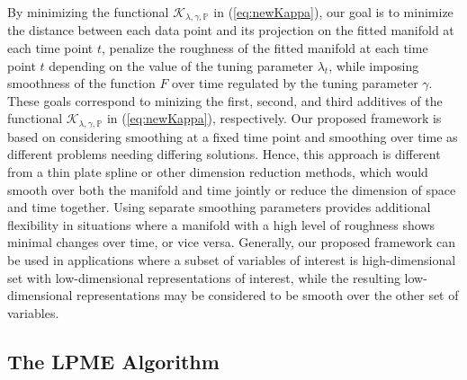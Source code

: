 \documentclass[11pt,reqno]{article}
\theoremstyle{definition}
\begin{document}
By minimizing the functional $\mathcal{K}_{\lambda, \gamma, \mathbb{P}}$ in (\ref{eq:newKappa}), our goal is to minimize the distance between each data point and its projection on the fitted manifold at each time point $t$, penalize the roughness of the fitted manifold at each time point $t$ depending on the value of the tuning parameter $\lambda_t$, while imposing smoothness of the function $F$ over time regulated by the tuning parameter $\gamma$. These goals correspond to minizing the first, second, and third additives of the functional $\mathcal{K}_{\lambda, \gamma, \mathbb{P}}$ in (\ref{eq:newKappa}), respectively. Our proposed framework is based on considering smoothing at a fixed time point and smoothing over time as different problems needing differing solutions. Hence, this approach is different from a thin plate spline or other dimension reduction methods, which would smooth over both the manifold and time jointly or reduce the dimension of space and time together. Using separate smoothing parameters provides additional flexibility in situations where a manifold with a high level of roughness shows minimal changes over time, or vice versa. Generally, our proposed framework can be used in applications where a subset of variables of interest is high-dimensional set with low-dimensional representations of interest, while the resulting low-dimensional representations may be considered to be smooth over the other set of variables. 







\subsection{The LPME Algorithm}
\end{document}
